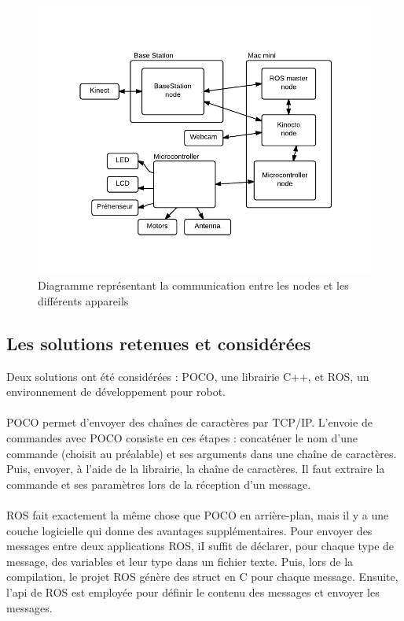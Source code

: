 \begin{figure}[htbp]
\centering
\includegraphics[scale=1]{fig/communicationNodesAppareils.pdf}
\caption{Diagramme représentant la communication entre les nodes et les différents appareils}
\label{fig:commNodes}
\end{figure}

\subsection{Les solutions retenues et considérées}
Deux solutions ont été considérées : POCO, une librairie C++, et ROS, un environnement de développement pour robot.

\paragraph{}POCO permet d’envoyer des chaînes de caractères par TCP/IP. L’envoie de commandes avec POCO consiste en ces étapes : concaténer le nom d’une commande (choisit au préalable) et ses arguments dans une chaîne de caractères. Puis, envoyer, à l’aide de la librairie, la chaîne de caractères. Il faut extraire la commande et ses paramètres lors de la réception d’un message.

\paragraph{}ROS fait exactement la même chose que POCO en arrière-plan, mais il y a une couche logicielle qui donne des avantages supplémentaires. Pour envoyer des messages entre deux applications ROS, iI suffit de déclarer, pour chaque type de message, des variables et leur type dans un fichier texte. Puis, lors de la compilation, le projet ROS génère des struct en C pour chaque message. Ensuite, l’api de ROS est employée pour définir le contenu des messages et envoyer les messages.

